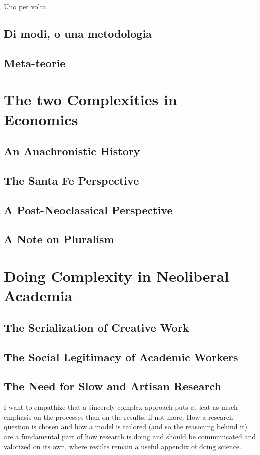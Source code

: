 \documentclass[a4paper, headings=standardclasses]{scrartcl}
\begin{document}
Uno per volta.



\subsection{Di modi, o una metodologia}

\subsection{Meta-teorie}

\section{The two Complexities in Economics}
\subsection{An Anachronistic History}

\subsection{The Santa Fe Perspective}

\subsection{A Post-Neoclassical Perspective}

\subsection{A Note on Pluralism}

\section{Doing Complexity in Neoliberal Academia}
\subsection{The Serialization of Creative Work}

\subsection{The Social Legitimacy of Academic Workers}

\subsection{The Need for Slow and Artisan Research}
I want to empathize that a sincerely complex approach puts at leat as much emphasis on the processes than on the results, if not more. How a research question is chosen and how a model is tailored (and so the reasoning behind it) are a fundamental part of how research is doing and should be communicated and valorized on its own, where results remain a useful appendix of doing science.

\printbibliography
\end{document}
